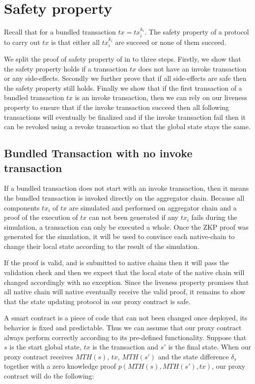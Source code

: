 \documentclass[acmtog, natbib=false]{acmart}
\begin{document}
\section{Safety property}
Recall that for a bundled transaction $tx = {tx_i^{k_i}}$. The safety property of a protocol to carry out $tx$ is that either all $tx_i^{k_i}$ are succeed or none of them succeed.

We split the proof of safety property of \dprotocol in to three steps. Firstly, we show that the safety property holds if a transaction $tx$ does not have an invoke transaction or any side-effects. Secondly we further prove that if all side-effects are safe then the safety property still holds. Finally we show that if the first transaction of a bundled transaction $tx$ is an invoke transaction, then we can rely on our liveness property to ensure that if the invoke transaction succeed then all following transactions will eventually be finalized and if the invoke transaction fail then it can be revoked using a revoke transaction so that the global state stays the same. 

\subsection{Bundled Transaction with no invoke transaction}
If a bundled transaction does not start with an invoke transaction, then it means the bundled transaction is invoked directly on the aggregator chain. Because all components $tx_i$ of $tx$ are simulated and performed on aggregator chain and a proof of the execution of $tx$ can not been generated if any $tx_i$ fails during the simulation, a transaction can only be executed a whole. Once the ZKP proof was generated for the simulation, it will be used to convince each native-chain to change their local state according to the result of the simulation.

If the proof is valid, and is submitted to native chains then it will pass the validation check and  then we expect that the local state of the native chain will changed accordingly with no exception. Since the liveness property promises that all native chain will native eventually receive the valid proof, it remains to show that the state updating protocol in our proxy contract is safe.

A smart contract is a piece of code that can not been changed once deployed, its behavior is fixed and predictable. Thus we can assume that our proxy contract always perform correctly according to its pre-defined functionality. Suppose that $s$ is the start global state, $tx$ is the transaction and $s'$ is the final state. When our proxy contract receives $MTH(s)$, $tx$, $MTH(s')$ and the state difference $\delta_{s}$ together with a zero knowledge proof $p(MTH(s), MTH(s'), tx)$, our proxy contract will do the following:
\end{document}
